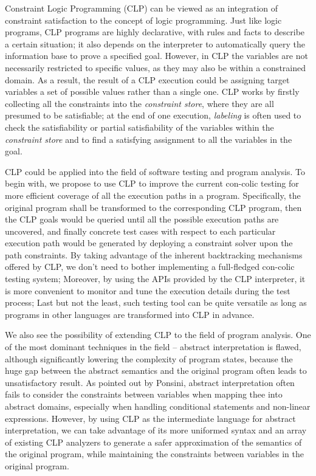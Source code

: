 \documentclass[12pt]{article}
\begin{document}
Constraint Logic Programming (CLP) can be viewed as an integration of constraint satisfaction to the concept of logic programming. Just like logic programs, CLP programs are highly declarative, with rules and facts to describe a certain situation; it also depends on the interpreter to automatically query the information base to prove a specified goal. However, in CLP the variables are not necessarily restricted to specific values, as they may also be within a constrained domain.  As a result, the result of a CLP execution could be assigning target variables a set of possible values rather than a single one. CLP works by firstly collecting all the constraints into the \emph{constraint store}, where they are all presumed to be satisfiable; at the end of one execution, \emph{labeling} is often used to check the satisfiability or partial satisfiability of the variables within the \emph{constraint store} and to find a satisfying assignment to all the variables in the goal.

CLP could be applied into the field of software testing and program analysis. To begin with, we propose to use CLP to improve the current con-colic testing for more efficient coverage of all the execution paths in a program. Specifically, the original program shall be transformed to the corresponding CLP program, then the CLP goals would be queried until all the possible execution paths are uncovered, and finally concrete test cases with respect to each particular execution path would be generated by deploying a constraint solver upon the path constraints. By taking advantage of the inherent backtracking mechanisms offered by CLP, we don't need to bother implementing a full-fledged con-colic testing system; Moreover, by using the APIs provided by the CLP interpreter, it is more convenient to monitor and tune the execution details during the test process; Last but not the least, such testing tool can be quite versatile as long as programs in other languages are transformed into CLP in advance.

We also see the possibility of extending CLP to the field of program analysis. One of the most dominant techniques in the field -- abstract interpretation is flawed, although significantly lowering the complexity of program states, because the huge gap between the abstract semantics and the original program often leads to unsatisfactory result. As pointed out by Ponsini, abstract interpretation often fails to consider the constraints between variables when mapping thee into abstract domains, especially when handling conditional statements and non-linear expressions. However, by using CLP as the intermediate language for abstract interpretation, we can take advantage of its more uniformed syntax and an array of existing CLP analyzers to generate a safer approximation of the semantics of the original program, while maintaining the constraints between variables in the original program.
\end{document}
